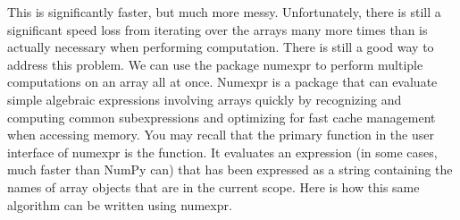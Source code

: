 
This is significantly faster, but much more messy.
Unfortunately, there is still a significant speed loss from iterating over the arrays many more times than is actually necessary when performing computation.
There is still a good way to address this problem.
We can use the package numexpr to perform multiple computations on an array all at once.
Numexpr is a package that can evaluate simple algebraic expressions involving arrays quickly by recognizing and computing common subexpressions and optimizing for fast cache management when accessing memory.
You may recall that the primary function in the user interface of numexpr is the  function.
It evaluates an expression (in some cases, much faster than NumPy can) that has been expressed as a string containing the names of array objects that are in the current scope.
Here is how this same algorithm can be written using numexpr.


